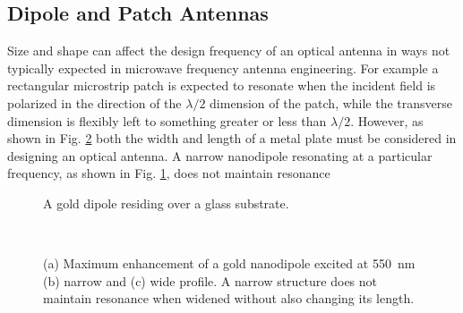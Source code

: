\documentclass[11pt]{article}
\begin{document}
\subsection{Dipole and Patch Antennas}
%
Size and shape can affect the design frequency of an optical antenna in ways not typically expected in microwave frequency antenna engineering. For example a rectangular microstrip patch is expected to resonate when the incident field is polarized in the direction of the $\lambda/2$ dimension of the patch, while the transverse dimension is flexibly left to something greater or less than $\lambda/2$. However, as shown in Fig. \ref{fig:simulation} both the width and length of a metal plate must be considered in designing an optical antenna. A narrow nanodipole resonating at a particular frequency, as shown in Fig. \ref{fig:nitin_dipole}, does not maintain resonance
%
\begin{figure}[b!]
  \centering
  \def\svgwidth{.75\linewidth}
  
  \caption{A gold dipole residing over a glass substrate.}
  \label{fig:nitin_dipole}
\end{figure}
%
\begin{figure}[t!]
  \centering
  \\
  \centering
   \hfil
   \hfil
  \caption{(a) Maximum enhancement of a gold nanodipole excited at \SI{550}{\nm} (b) narrow and (c) wide profile. A narrow structure does not maintain resonance when widened without also changing its length.}
  \label{fig:simulation}
\end{figure}
\end{document}
